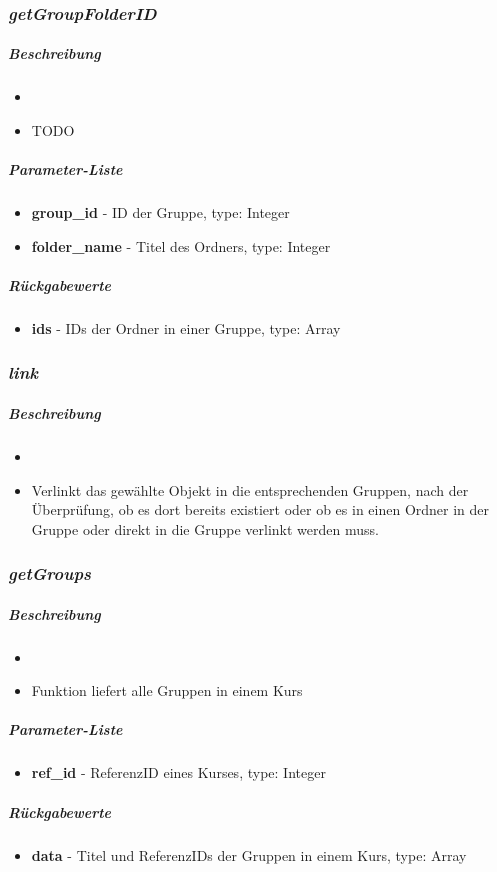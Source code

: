 \subsubsection*{\textit{getGroupFolderID}}\label{getGroupFolderIDLGUI}
\subparagraph{Beschreibung}
\begin{itemize}
	\item[] \noindent{} 
	\item[] TODO
\end{itemize}
\subparagraph{Parameter-Liste}
\begin{itemize}
	\item[] \textbf{group\_id} - ID der Gruppe, type: Integer
	\item[] \textbf{folder\_name} - Titel des Ordners, type: Integer
\end{itemize}
\subparagraph{Rückgabewerte}
\begin{itemize}
	\item[] \textbf{ids} - IDs der Ordner in einer Gruppe, type: Array
\end{itemize}

\subsubsection*{\textit{link}}\label{linkLGUI}
\subparagraph{Beschreibung}
\begin{itemize}
	\item[] \noindent{} 
	\item[] Verlinkt das gewählte Objekt in die entsprechenden Gruppen, nach der Überprüfung, ob es dort bereits existiert oder ob es in einen Ordner in der Gruppe oder direkt in die Gruppe verlinkt werden muss.
\end{itemize}

\subsubsection*{\textit{getGroups}}\label{getGroupsLGUI}
\subparagraph{Beschreibung}
\begin{itemize}
	\item[] \noindent{} 
	\item[] Funktion liefert alle Gruppen in einem Kurs
\end{itemize}
\subparagraph{Parameter-Liste}
\begin{itemize}
	\item[] \textbf{ref\_id} - ReferenzID eines Kurses, type: Integer
\end{itemize}
\subparagraph{Rückgabewerte}
\begin{itemize}
	\item[] \textbf{data} - Titel und ReferenzIDs der Gruppen in einem Kurs, type: Array
\end{itemize}

